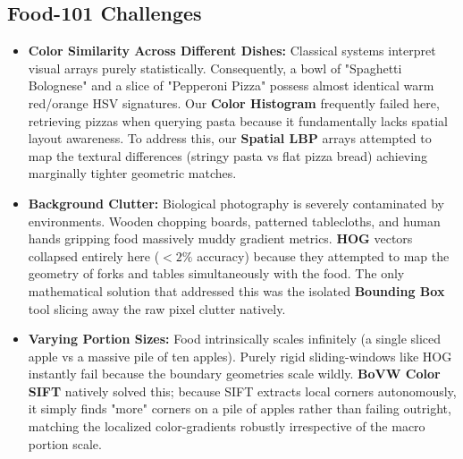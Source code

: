 \documentclass[11pt, a4paper]{article}
\begin{document}
\subsection{Food-101 Challenges}
\begin{itemize}
    \item \textbf{Color Similarity Across Different Dishes:} Classical systems interpret visual arrays purely statistically. Consequently, a bowl of "Spaghetti Bolognese" and a slice of "Pepperoni Pizza" possess almost identical warm red/orange HSV signatures. Our \textbf{Color Histogram} frequently failed here, retrieving pizzas when querying pasta because it fundamentally lacks spatial layout awareness. To address this, our \textbf{Spatial LBP} arrays attempted to map the textural differences (stringy pasta vs flat pizza bread) achieving marginally tighter geometric matches.
    \item \textbf{Background Clutter:} Biological photography is severely contaminated by environments. Wooden chopping boards, patterned tablecloths, and human hands gripping food massively muddy gradient metrics. \textbf{HOG} vectors collapsed entirely here ($<2\%$ accuracy) because they attempted to map the geometry of forks and tables simultaneously with the food. The only mathematical solution that addressed this was the isolated \textbf{Bounding Box} tool slicing away the raw pixel clutter natively.
    \item \textbf{Varying Portion Sizes:} Food intrinsically scales infinitely (a single sliced apple vs a massive pile of ten apples). Purely rigid sliding-windows like HOG instantly fail because the boundary geometries scale wildly. \textbf{BoVW Color SIFT} natively solved this; because SIFT extracts local corners autonomously, it simply finds "more" corners on a pile of apples rather than failing outright, matching the localized color-gradients robustly irrespective of the macro portion scale.
\end{itemize}
\end{document}
